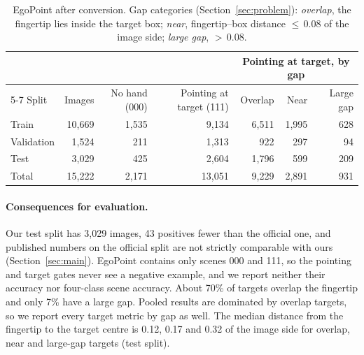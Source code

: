 \begin{table}[t]
  \caption{EgoPoint after conversion. Gap categories (Section~\ref{sec:problem}): \emph{overlap}, the fingertip lies inside the target box; \emph{near}, fingertip--box distance ${\leq}\,0.08$ of the image side; \emph{large gap}, ${>}\,0.08$.}
  \label{tab:data}
  \footnotesize
  \begin{tabular}{lrrrrrr}
    \toprule
    & & & & \multicolumn{3}{c}{Pointing at target, by gap} \\
    \cmidrule(l){5-7}
    Split & Images & No hand (000) & Pointing at target (111) & Overlap & Near & Large gap \\
    \midrule
    Train & 10,669 & 1,535 & 9,134 & 6,511 & 1,995 & 628 \\
    Validation & 1,524 & 211 & 1,313 & 922 & 297 & 94 \\
    Test & 3,029 & 425 & 2,604 & 1,796 & 599 & 209 \\
    \midrule
    Total & 15,222 & 2,171 & 13,051 & 9,229 & 2,891 & 931 \\
    \bottomrule
  \end{tabular}
\end{table}

\paragraph{Consequences for evaluation.} Our test split has 3,029 images, 43 positives fewer than the official one, and published numbers on the official split are not strictly comparable with ours (Section~\ref{sec:main}). EgoPoint contains only scenes 000 and 111, so the pointing and target gates never see a negative example, and we report neither their accuracy nor four-class scene accuracy. About 70\% of targets overlap the fingertip and only 7\% have a large gap. Pooled results are dominated by overlap targets, so we report every target metric by gap as well. The median distance from the fingertip to the target centre is 0.12, 0.17 and 0.32 of the image side for overlap, near and large-gap targets (test split).


